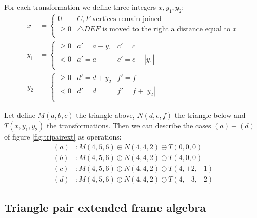 \documentclass[11pt]{article}
\begin{document}
For each transformation we define three integers $x, y_1, y_2$:
\begin{align}
x &= \left \{ \begin{array}{rl}
 0       & C,F \mbox{ vertices remain joined}\\
 \geq  0 & \triangle{DEF} \mbox{ is moved to the right a distance equal to } x \\
 \end{array}\right. \\
y_1 &= \left \{ \begin{array}{rll}
 \geq 0 & a' = a + y_1 & c' = c \\
 < 0 & a' = a          & c' = c + |y_1| \\
 \end{array}\right. \\ 
y_2 &= \left \{ \begin{array}{rll}
 \geq 0 & d' = d + y_2 & f' = f \\
 < 0 & d' = d          & f' = f + |y_2| \\
 \end{array}\right. 
\end{align}

Let define $M(a,b,c)$ the triangle above, $N(d,e,f)$ the triangle below and $T(x,y_1,y_2)$ the transformations.
Then we can describe the cases $(a)-(d)$ of figure \ref{fig:tripairext} as operations:
\begin{align*}
(a) &: M(4,5,6) \oplus N(4,4,2) \oplus T(0,0,0) \\
(b) &: M(4,5,6) \oplus N(4,4,2) \oplus T(4,0,0) \\
(c) &: M(4,5,6) \oplus N(4,4,2) \oplus T(4,+2,+1) \\
(d) &: M(4,5,6) \oplus N(4,4,2) \oplus T(4,-3,-2)
\end{align*}

\subsection{Triangle pair extended frame algebra}
\end{document}
